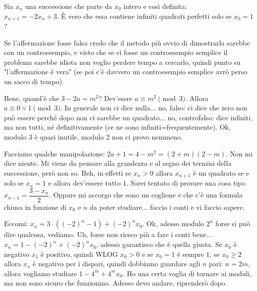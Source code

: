 \begin{prob}
  Sia $x_n$ una successione che parte da $x_0$ intero e così definita: \\ $x_{n+1}=-2x_n+3$. È vero che essa contiene infiniti quadrati perfetti solo se $x_0=1$?
\end{prob}

\begin{sol}
  Se l'affermazione fosse falsa credo che il metodo più ovvio di dimostrarla sarebbe con un controesempio, e visto che se ci fosse un controesempio semplice il problema sarebbe idiota non voglio perdere tempo a cercarlo, quindi punto su "l'affermazione è vera" (se poi c'è davvero un controesempio semplice avrò perso un sacco di tempo).

  Bene, quand'è che $3-2a=m^2$? Dev'essre $a \equiv m^2 \pmod{3}$. Allora $a \equiv 0 \lor 1 \pmod{3}$. In generale non ci dice nulla... no, falso: ci dice che zero non può essere perché dopo non ci sarebbe un quadrato... no, controfalso: dice infiniti, ma non tutti, né definitivamente (ce ne sono infiniti=frequentemente). Ok, modulo $3$ è quasi inutile, modulo $2$ non ci provo nemmeno.

  Facciamo qualche manipolazione: $2a+1=4-m^2=(2+m)(2-m)$. Non mi dice niente. Mi viene da pensare alla grandezza e al segno dei termini della successione, però non so. Beh, in effetti se $x_n>0$ allora $x_{n+1}$ è un quadrato se e solo se $x_n=1$ e allora dev'essere tutto $1$. Sarei tentato di provare una cosa tipo $x_{n-1}=\dfrac{3-x_n}{2}$. Oppure mi accorgo che sono un coglione e che c'è una formula chiusa in funzione di $x_0$ e $n$ da poter studiare... faccio i conti e vi faccio sapere.

  Eccomi: $x_n=3\cdot((-2)^n-1)+(-2)^nx_0$. Ok, adesso modulo $2^n$ forse si può dire qualcosa, vediamo. Uh, forse non riesco più a fare i conti bene... $x_n=1-(-2)^n+(-2)^nx_0$, adesso garantisco che è quella giusta. Se $x_0$ è negativo $x_1$ è positivo, quindi WLOG $x_0>0$ e se $x_0=1$ è sempre $1$, se $x_0 \ge 2$ allora $x_n$ è negativo per i dispari, quindi dobbiamo guardare agli $n$ pari: $n=2m$, allora vogliamo studiare $1-4^m+4^mx_0$. Ho una certa voglia di tornare ai moduli, ma non sono sicuro che funzionino. Adesso devo andare, riprenderò dopo.


\end{sol}
